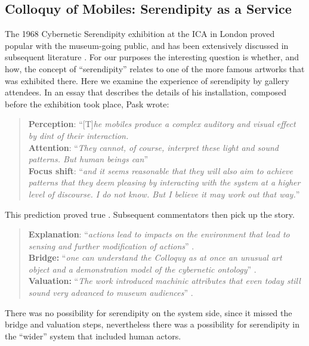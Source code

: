 \subsection{{\sf Colloquy of Mobiles}: Serendipity as a Service}

The 1968 Cybernetic Serendipity exhibition at the ICA in London proved popular with the museum-going public, and has been extensively discussed in subsequent literature
\cite{Edmonds1994,macgregor2002cybernetic,usselmann2003dilemma}.  For
our purposes the interesting question is whether, and how, the concept
of ``serendipity'' relates to one of the more famous artworks that was
exhibited there.
Here we examine the experience of serendipity by gallery attendees.
In an essay that describes the details of his installation, composed
before the exhibition took place, Pask wrote:

\begin{quote}
\textbf{Perception}: ``[T]\emph{he mobiles produce a complex auditory
  and visual effect by dint of their interaction.}\\
\textbf{Attention}: ``\emph{They cannot, of course, interpret these
  light and sound patterns.  But human beings can}''\\
\textbf{Focus shift}: ``\emph{and it seems reasonable that they will
  also aim to achieve patterns that they deem pleasing by interacting
  with the system at a higher level of discourse. I do not know.  But
  I believe it may work out that way.}''
\cite[p.~91]{pask1971comment} 
\end{quote}
This prediction proved true \cite[p.~98]{pask1971comment}.  Subsequent
commentators then pick up the story.
\begin{quote}
\textbf{Explanation}: ``\emph{actions lead to impacts on the environment that lead to sensing and further modification of actions}'' \cite{haque2007architectural}.\\
\textbf{Bridge:} 
``\emph{one can understand the Colloquy as at once an unusual art
  object and a demonstration model of the cybernetic ontology}''
\cite[p.~48]{pickering2007ontological}.\\
\textbf{Valuation:} 
``\emph{The work introduced machinic attributes that even today still sound
very advanced to museum audiences}''
\cite[p.~5]{gemeinboeck2015performance}.
\end{quote}
There was no possibility for serendipity on the system side, since it
missed the bridge and valuation steps, nevertheless there was a
possibility for serendipity in the ``wider'' system that included
human actors.

